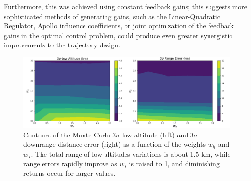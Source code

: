 \documentclass[journal ]{new-aiaa}
\begin{document}
Furthermore, this was achieved using constant feedback gains; this suggests more sophisticated methods of generating gains, such as the Linear-Quadratic Regulator, Apollo influence coefficients, or joint optimization of the feedback gains in the optimal control problem, could produce even greater synergistic improvements to the trajectory design. 
\begin{figure}[h!]
	\centering
	\includegraphics[width=1\textwidth]{ddp/weight_sweeps_mc}
	\caption{Contours of the Monte Carlo 3$\sigma$ low altitude (left) and 3$\sigma$ downrange distance error (right) as a function of the weights $w_h$ and $w_s$. The total range of low altitudes variations is about 1.5 km, while range errors rapidly improve as $w_s$ is raised to 1, and diminishing returns occur for larger values.}
	\label{fig_weight_sweep}
\end{figure}
\end{document}
